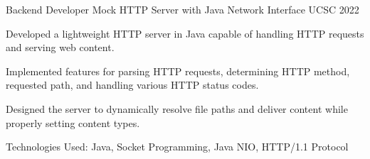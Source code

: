 \begin{cventries}
    \cventry
    {Backend Developer} %
    {Mock HTTP Server with Java Network Interface \href{https://github.com/kulasinghet/web-server.git}{\faGithubSquare}} %
    {UCSC} %
    {2022} %
    {
        \begin{cvitems} %
            \item {Developed a lightweight HTTP server in Java capable of handling HTTP requests and serving web content.}
            \item {Implemented features for parsing HTTP requests, determining HTTP method, requested path, and handling various HTTP status codes.}
            \item {Designed the server to dynamically resolve file paths and deliver content while properly setting content types.}
            \item {Technologies Used: Java, Socket Programming, Java NIO, HTTP/1.1 Protocol}
        \end{cvitems}
    }



\end{cventries}
